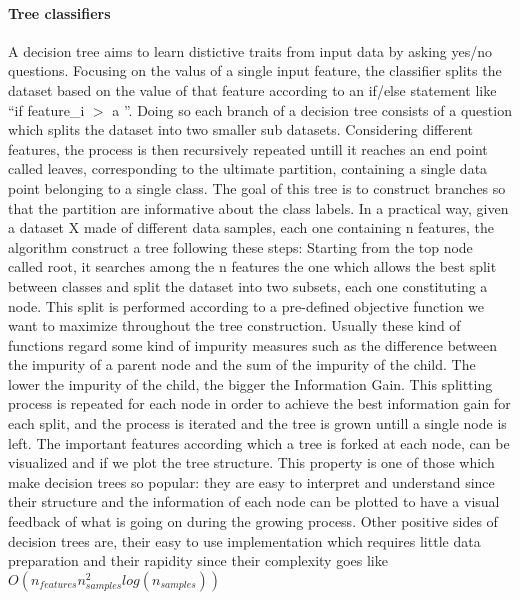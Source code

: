 \documentclass[11pt]{report}
\begin{document}
\paragraph{Tree classifiers} \hfill

A decision tree aims to learn distictive traits from input data by asking yes/no questions. Focusing on the valus of a single input feature, the classifier splits the dataset based on the value of that feature according to an if/else statement like \textquotedblleft if feature\_i $>$ a \textquotedblright.
Doing so each branch of a decision tree consists of a question which splits the dataset into two smaller sub datasets.
Considering different features, the process is then recursively repeated untill it reaches an end point called leaves, corresponding to the ultimate partition, containing a single data point belonging to a single class.
The goal of this tree is to construct branches so that the partition are informative about the class labels.
In a practical way, given a dataset X made of different data samples, each one containing n features, the algorithm construct a tree following these steps:
Starting from the top node called root, it searches among the n features the one which allows the best split between classes and split the dataset into two subsets, each one constituting a node. This split is performed according to a pre-defined objective function we want to maximize throughout the tree construction.
Usually these kind of functions regard some kind of impurity measures such as the difference between the impurity of a parent node and the sum of the impurity of the child.
The lower the impurity of the child, the bigger the Information Gain.
This splitting process is repeated for each node in order to achieve the best information gain for each split, and
the process is iterated and the tree is grown untill a single node is left.
The important features according which a tree is forked at each node, can be visualized and if we plot the tree structure.
This property is one of those which make decision trees so popular: they are easy to interpret and understand since their structure and the information of each node can be plotted to have a visual feedback of what is going on during the growing process.
Other positive sides of decision trees are, their easy to use implementation which requires little data preparation and their rapidity since their complexity goes like $O(n_{features}n_{samples}^2log(n_{samples}))$ \cite{scikit-2011}
\end{document}
